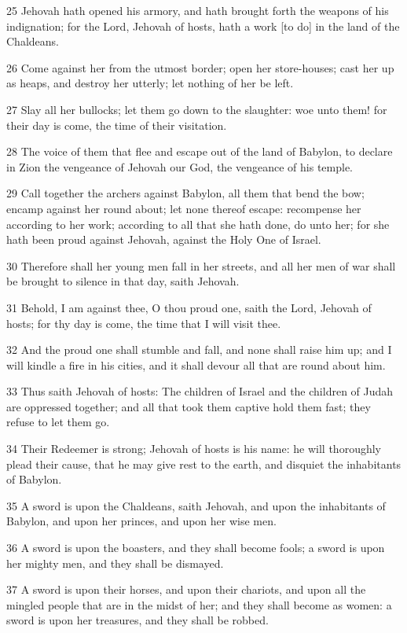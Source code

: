 \par 25 Jehovah hath opened his armory, and hath brought forth the weapons of his indignation; for the Lord, Jehovah of hosts, hath a work [to do] in the land of the Chaldeans.
\par 26 Come against her from the utmost border; open her store-houses; cast her up as heaps, and destroy her utterly; let nothing of her be left.
\par 27 Slay all her bullocks; let them go down to the slaughter: woe unto them! for their day is come, the time of their visitation.
\par 28 The voice of them that flee and escape out of the land of Babylon, to declare in Zion the vengeance of Jehovah our God, the vengeance of his temple.
\par 29 Call together the archers against Babylon, all them that bend the bow; encamp against her round about; let none thereof escape: recompense her according to her work; according to all that she hath done, do unto her; for she hath been proud against Jehovah, against the Holy One of Israel.
\par 30 Therefore shall her young men fall in her streets, and all her men of war shall be brought to silence in that day, saith Jehovah.
\par 31 Behold, I am against thee, O thou proud one, saith the Lord, Jehovah of hosts; for thy day is come, the time that I will visit thee.
\par 32 And the proud one shall stumble and fall, and none shall raise him up; and I will kindle a fire in his cities, and it shall devour all that are round about him.
\par 33 Thus saith Jehovah of hosts: The children of Israel and the children of Judah are oppressed together; and all that took them captive hold them fast; they refuse to let them go.
\par 34 Their Redeemer is strong; Jehovah of hosts is his name: he will thoroughly plead their cause, that he may give rest to the earth, and disquiet the inhabitants of Babylon.
\par 35 A sword is upon the Chaldeans, saith Jehovah, and upon the inhabitants of Babylon, and upon her princes, and upon her wise men.
\par 36 A sword is upon the boasters, and they shall become fools; a sword is upon her mighty men, and they shall be dismayed.
\par 37 A sword is upon their horses, and upon their chariots, and upon all the mingled people that are in the midst of her; and they shall become as women: a sword is upon her treasures, and they shall be robbed.
